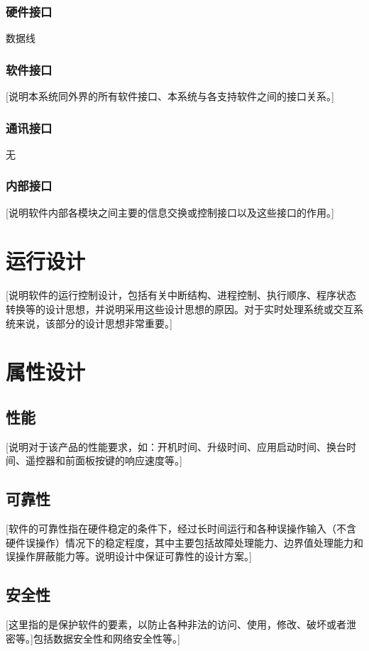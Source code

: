 \documentclass[10pt,a4paper,titlepage]{article} %
\begin{document}
\subsubsection{硬件接口}
数据线
\subsubsection{软件接口}
[说明本系统同外界的所有软件接口、本系统与各支持软件之间的接口关系。]\newline
\subsubsection{通讯接口}
无
\subsubsection{内部接口}
[说明软件内部各模块之间主要的信息交换或控制接口以及这些接口的作用。]\newline
\section{运行设计}
[说明软件的运行控制设计，包括有关中断结构、进程控制、执行顺序、程序状态转换等的设计思想，并说明采用这些设计思想的原因。对于实时处理系统或交互系统来说，该部分的设计思想非常重要。]\newline
\section{属性设计}
\subsection{性能}
[说明对于该产品的性能要求，如：开机时间、升级时间、应用启动时间、换台时间、遥控器和前面板按键的响应速度等。]\newline
\subsection{可靠性}
[软件的可靠性指在硬件稳定的条件下，经过长时间运行和各种误操作输入（不含硬件误操作）情况下的稳定程度，其中主要包括故障处理能力、边界值处理能力和误操作屏蔽能力等。说明设计中保证可靠性的设计方案。]\newline
\subsection{安全性}
[这里指的是保护软件的要素，以防止各种非法的访问、使用，修改、破坏或者泄密等。]包括数据安全性和网络安全性等。]\newline
\end{document}
